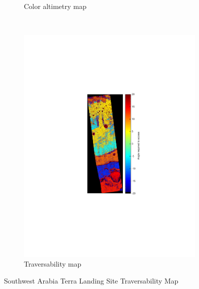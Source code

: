 \documentclass[12pt]{article}
\begin{document}
\begin{figure}[h!]
\begin{subfigure}[t]{0.33\textwidth}
    \caption{Color altimetry map}
    \label{fig:southwest_dtm}
  \end{subfigure}
  ~
  \begin{subfigure}[t]{0.33\textwidth}
    \centering
    \includegraphics[height=0.5\paperheight]{figures/maps/ESP_011844_1855/DTEEC_011844_1855_002812_1855_A01-traversability_map.pdf}
    \caption{Traversability map}
    \label{fig:southwest_traversability}
  \end{subfigure}
  \caption{Southwest Arabia Terra Landing Site Traversability Map}
  \label{fig:southwest}
\end{figure}
\end{document}
